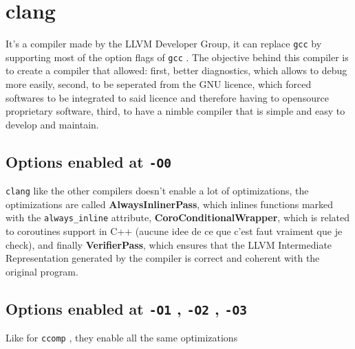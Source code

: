 \documentclass{rapport}
\newcommand{\gcc}{\texttt{gcc} }
\newcommand{\clang}{\texttt{clang} }
\newcommand{\comp}{\texttt{ccomp} }
\newcommand{\optizero}{\texttt{-O0} }
\newcommand{\optione}{\texttt{-O1} }
\newcommand{\optitwo}{\texttt{-O2} }
\newcommand{\optithree}{\texttt{-O3} }
\begin{document}
\section{clang}
It's a compiler made by the LLVM Developer Group, it can replace \gcc by supporting most of the option flags of \gcc. \newline
The objective behind this compiler is to create a compiler that allowed: first, better diagnostics, which allows to debug more easily, second, to be seperated from the GNU licence, which forced
softwares to be integrated to said licence and therefore having to open\-source proprietary software, third, to have a nimble compiler that is simple and easy to develop and maintain.
\subsection{Options enabled at \optizero}
\clang like the other compilers doesn't enable a lot of optimizations, the optimizations are called \textbf{AlwaysInlinerPass}, which inlines functions marked
with the \texttt{always\_inline} attribute, \textbf{CoroConditionalWrapper}, which is related to coroutines support in C++ (aucune idee de ce que c'est faut vraiment
que je check), and finally \textbf{VerifierPass}, which ensures that the LLVM Intermediate Representation generated by the compiler is correct and coherent 
with the original program.

\subsection{Options enabled at \optione, \optitwo, \optithree}
Like for \comp, they enable all the same optimizations


\clearpage
\nocite{*}


\end{document}
